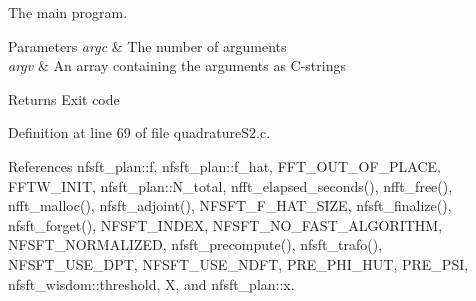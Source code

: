 The main program. 


\begin{DoxyParams}{Parameters}
{\em argc} & The number of arguments \\
\hline
{\em argv} & An array containing the arguments as C-\/strings\\
\hline
\end{DoxyParams}
\begin{DoxyReturn}{Returns}
Exit code 
\end{DoxyReturn}


Definition at line 69 of file quadrature\-S2.\-c.



References nfsft\-\_\-plan\-::f, nfsft\-\_\-plan\-::f\-\_\-hat, F\-F\-T\-\_\-\-O\-U\-T\-\_\-\-O\-F\-\_\-\-P\-L\-A\-C\-E, F\-F\-T\-W\-\_\-\-I\-N\-I\-T, nfsft\-\_\-plan\-::\-N\-\_\-total, nfft\-\_\-elapsed\-\_\-seconds(), nfft\-\_\-free(), nfft\-\_\-malloc(), nfsft\-\_\-adjoint(), N\-F\-S\-F\-T\-\_\-\-F\-\_\-\-H\-A\-T\-\_\-\-S\-I\-Z\-E, nfsft\-\_\-finalize(), nfsft\-\_\-forget(), N\-F\-S\-F\-T\-\_\-\-I\-N\-D\-E\-X, N\-F\-S\-F\-T\-\_\-\-N\-O\-\_\-\-F\-A\-S\-T\-\_\-\-A\-L\-G\-O\-R\-I\-T\-H\-M, N\-F\-S\-F\-T\-\_\-\-N\-O\-R\-M\-A\-L\-I\-Z\-E\-D, nfsft\-\_\-precompute(), nfsft\-\_\-trafo(), N\-F\-S\-F\-T\-\_\-\-U\-S\-E\-\_\-\-D\-P\-T, N\-F\-S\-F\-T\-\_\-\-U\-S\-E\-\_\-\-N\-D\-F\-T, P\-R\-E\-\_\-\-P\-H\-I\-\_\-\-H\-U\-T, P\-R\-E\-\_\-\-P\-S\-I, nfsft\-\_\-wisdom\-::threshold, X, and nfsft\-\_\-plan\-::x.

